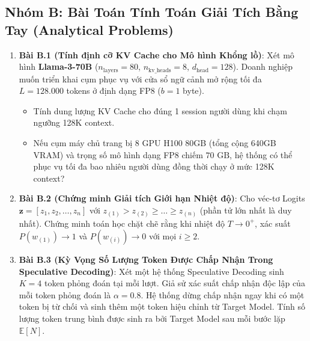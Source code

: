 \subsection{Nhóm B: Bài Toán Tính Toán Giải Tích Bằng Tay (Analytical Problems)}
\begin{enumerate}
  \item \textbf{Bài B.1 (Tính định cỡ KV Cache cho Mô hình Khổng lồ)}:
  Xét mô hình \textbf{Llama-3-70B} ($n_{\text{layers}} = 80$, $n_{\text{kv\_heads}} = 8$, $d_{\text{head}} = 128$).
  Doanh nghiệp muốn triển khai cụm phục vụ với cửa sổ ngữ cảnh mở rộng tối đa $L = 128.000$ tokens ở định dạng FP8 ($b = 1$ byte).
  \begin{itemize}
    \item[a)] Tính dung lượng KV Cache cho đúng 1 session người dùng khi chạm ngưỡng 128K context.
    \item[b)] Nếu cụm máy chủ trang bị 8 GPU H100 80GB (tổng cộng 640GB VRAM) và trọng số mô hình dạng FP8 chiếm $70\text{ GB}$, hệ thống có thể phục vụ tối đa bao nhiêu người dùng đồng thời chạy ở mức 128K context?
  \end{itemize}

  \item \textbf{Bài B.2 (Chứng minh Giải tích Giới hạn Nhiệt độ)}:
  Cho véc-tơ Logits $\mathbf{z} = [z_1, z_2, \dots, z_n]$ với $z_{(1)} > z_{(2)} \ge \dots \ge z_{(n)}$ (phần tử lớn nhất là duy nhất).
  Chứng minh toán học chặt chẽ rằng khi nhiệt độ $T \to 0^+$, xác suất $P(w_{(1)}) \to 1$ và $P(w_{(i)}) \to 0$ với mọi $i \ge 2$.

  \item \textbf{Bài B.3 (Kỳ Vọng Số Lượng Token Được Chấp Nhận Trong Speculative Decoding)}:
  Xét một hệ thống Speculative Decoding sinh $K = 4$ token phỏng đoán tại mỗi lượt. Giả sử xác suất chấp nhận độc lập của mỗi token phỏng đoán là $\alpha = 0.8$.
  Hệ thống dừng chấp nhận ngay khi có một token bị từ chối và sinh thêm một token hiệu chỉnh từ Target Model.
  Tính số lượng token trung bình được sinh ra bởi Target Model sau mỗi bước lặp $\mathbb{E}[N]$.


\end{enumerate}
